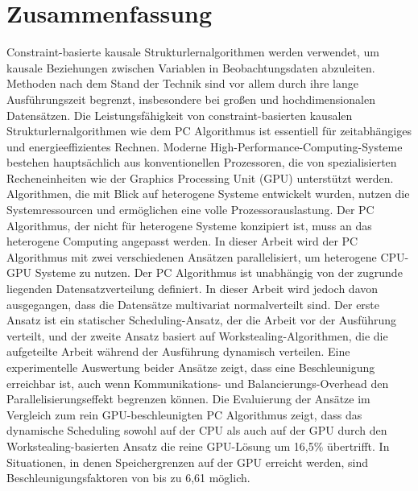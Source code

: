 \chapter*{Zusammenfassung}
Constraint-basierte kausale Strukturlernalgorithmen werden verwendet, um kausale Beziehungen zwischen Variablen in Beobachtungsdaten abzuleiten. Methoden nach dem Stand der Technik sind vor allem durch ihre lange Ausführungszeit begrenzt, insbesondere bei großen und hochdimensionalen Datensätzen. Die Leistungsfähigkeit von constraint-basierten kausalen Strukturlernalgorithmen wie dem PC Algorithmus ist essentiell für zeitabhängiges und energieeffizientes Rechnen. Moderne High-Performance-Computing-Systeme bestehen hauptsächlich aus konventionellen Prozessoren, die von spezialisierten Recheneinheiten wie der Graphics Processing Unit (GPU) unterstützt werden. Algorithmen, die mit Blick auf heterogene Systeme entwickelt wurden, nutzen die Systemressourcen und ermöglichen eine volle Prozessorauslastung. Der PC Algorithmus, der nicht für heterogene Systeme konzipiert ist, muss an das heterogene Computing angepasst werden. In dieser Arbeit wird der PC Algorithmus mit zwei verschiedenen Ansätzen parallelisiert, um heterogene CPU-GPU Systeme zu nutzen. Der PC Algorithmus ist unabhängig von der zugrunde liegenden Datensatzverteilung definiert. In dieser Arbeit wird jedoch davon ausgegangen, dass die Datensätze multivariat normalverteilt sind. Der erste Ansatz ist ein statischer Scheduling-Ansatz, der die Arbeit vor der Ausführung verteilt, und der zweite Ansatz basiert auf Workstealing-Algorithmen, die die aufgeteilte Arbeit während der Ausführung dynamisch verteilen. Eine experimentelle Auswertung beider Ansätze zeigt, dass eine Beschleunigung erreichbar ist, auch wenn Kommunikations- und Balancierungs-Overhead den Parallelisierungseffekt begrenzen können. Die Evaluierung der Ansätze im Vergleich zum rein GPU-beschleunigten PC Algorithmus zeigt, dass das dynamische Scheduling sowohl auf der CPU als auch auf der GPU durch den Workstealing-basierten Ansatz die reine GPU-Lösung um 16,5\% übertrifft. In Situationen, in denen Speichergrenzen auf der GPU erreicht werden, sind Beschleunigungsfaktoren von bis zu 6,61 möglich.